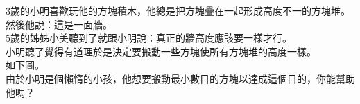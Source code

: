 3歲的小明喜歡玩他的方塊積木，他總是把方塊疊在一起形成高度不一的方塊堆。\\
然後他說：這是一面牆。\\
5歲的姊姊小美聽到了就跟小明說：真正的牆高度應該要一樣才行。\\
小明聽了覺得有道理於是決定要搬動一些方塊使所有方塊堆的高度一樣。\\
如下圖。\\
由於小明是個懶惰的小孩，他想要搬動最小數目的方塊以達成這個目的，你能幫助他嗎？